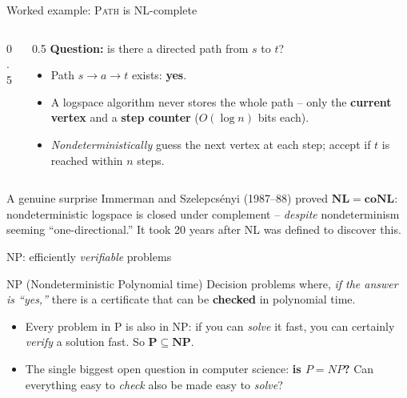 \documentclass[11pt,aspectratio=169]{beamer}
\begin{document}
\begin{frame}{Worked example: \textsc{Path} is NL-complete}
  \begin{columns}
  \begin{column}{0.5\textwidth}
  \begin{center}
  \end{center}
  \end{column}
  \begin{column}{0.5\textwidth}
  \textbf{Question:} is there a directed path from $s$ to $t$?
  \begin{itemize}
    \item Path $s \to a \to t$ exists: \textbf{yes}.
    \item A logspace algorithm never stores the whole path -- only the
    \textbf{current vertex} and a \textbf{step counter} ($O(\log n)$ bits each).
    \item \emph{Nondeterministically} guess the next vertex at each step; accept if $t$
    is reached within $n$ steps.
  \end{itemize}
  \end{column}
  \end{columns}
  \vspace{0.5em}
  \begin{exampleblock}{A genuine surprise}
    Immerman and Szelepcs\'enyi (1987--88) proved $\mathbf{NL = coNL}$: nondeterministic
    logspace is closed under complement -- \emph{despite} nondeterminism seeming
    ``one-directional.'' It took 20 years after NL was defined to discover this.
  \end{exampleblock}
\end{frame}

\begin{frame}{NP: efficiently \emph{verifiable} problems}
  \begin{block}{NP (Nondeterministic Polynomial time)}
    Decision problems where, \emph{if the answer is ``yes,''} there is a certificate
    that can be \textbf{checked} in polynomial time.
  \end{block}
  \begin{itemize}
    \item Every problem in P is also in NP: if you can \emph{solve} it fast, you can
    certainly \emph{verify} a solution fast. So $\mathbf{P \subseteq NP}$.
    \item The single biggest open question in computer science: \textbf{is $P = NP$?}
    Can everything easy to \emph{check} also be made easy to \emph{solve}?
  \end{itemize}
\end{frame}
\end{document}
